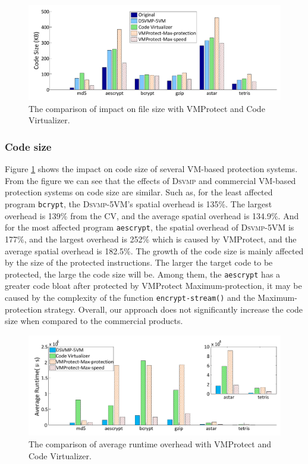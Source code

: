 \documentclass[preprint,12pt,3p]{elsarticle}
\newcommand{\DSVMP}{\textsc{Dsvmp}\xspace}
\begin{document}
\begin{figure}[t]%
    \centering
    \includegraphics[width=0.8\columnwidth]{figure/comsize.pdf}
    \caption{The comparison of impact on file size with VMProtect and Code Virtualizer.}\label{fig:Fig.com-size}
\end{figure}

\subsubsection{Code size}
Figure \ref{fig:Fig.com-size} shows the impact on code size of several VM-based protection systems.
From the figure we can see that the effects of \DSVMP and commercial VM-based protection systems on code size are similar.
Such as, for the least affected program \texttt{bcrypt}, the \DSVMP-5VM's spatial overhead is 135\%.
The largest overhead is 139\% from the CV, and the average spatial overhead is 134.9\%.
And for the most affected program \texttt{aescrypt}, the spatial overhead of \DSVMP-5VM is 177\%,
and the largest overhead is 252\% which is caused by VMProtect, and the average spatial overhead is 182.5\%.
The growth of the code size is mainly affected by the size of the protected instructions.
The larger the target code to be protected, the large the code size will be.
Among them, the \texttt{aescrypt} has a greater code bloat after protected by VMProtect Maximum-protection,
it may be caused by the complexity of the function \texttt{encrypt-stream()} and the Maximum-protection strategy.
Overall, our approach does not significantly increase the code size when compared to the commercial products.

\begin{figure}[t]%
    \centering
    \includegraphics[width=0.8\columnwidth]{figure/comtime.pdf}
    \caption{The comparison of average runtime overhead with VMProtect and Code Virtualizer.}\label{fig:Fig.com-time}
\end{figure}
\end{document}
